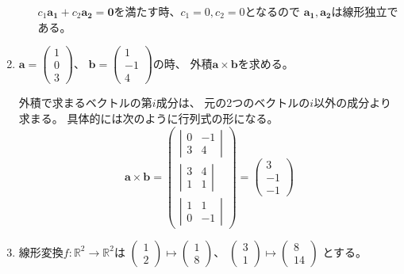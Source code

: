 \documentclass[10pt,b5paper]{ltjsarticle}
\begin{document}
\begin{enumerate}
\begin{enumerate}
            $c_1\bm{a_1}+c_2\bm{a_2}=\bm{0}$を満たす時、$c_1=0, c_2=0$となるので
            $\bm{a_1}, \bm{a_2}$は線形独立である。

      \end{enumerate}

 \item
      $\bm{a}=\left(\begin{matrix}1\\0\\3\end{matrix}\right)$、
      $\bm{b}=\left(\begin{matrix}1\\-1\\4\end{matrix}\right)$の時、
      外積$\bm{a}\times \bm{b}$を求める。

      外積で求まるベクトルの第$i$成分は、
      元の2つのベクトルの$i$以外の成分より求まる。
      具体的には次のように行列式の形になる。
      \begin{equation}
       \bm{a}\times \bm{b} =
              \left(
               \begin{matrix}
                \left| \begin{matrix} 0 & -1 \\ 3 & 4 \end{matrix} \right| \\
                \left| \begin{matrix} 3 & 4 \\ 1 & 1 \end{matrix} \right|\\
                \left| \begin{matrix} 1 & 1 \\ 0 & -1 \end{matrix} \right|
               \end{matrix}
              \right)
              =
              \left(
               \begin{matrix}
                3\\-1\\-1
               \end{matrix}
              \right)
      \end{equation}

 \item
      線形変換$f:\mathbb{R}^2\rightarrow \mathbb{R}^2$は
      $\left(\begin{matrix}1\\2\end{matrix}\right)\mapsto
      \left(\begin{matrix}1\\8\end{matrix}\right)$、
      $\left(\begin{matrix}3\\1\end{matrix}\right)\mapsto
      \left(\begin{matrix}8\\14\end{matrix}\right)$
      とする。


\end{enumerate}
\end{document}
